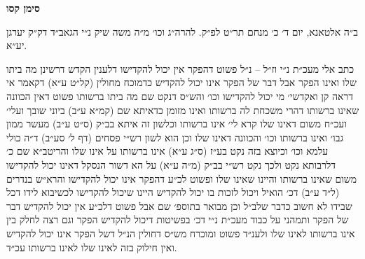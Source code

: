 \documentclass[12pt, openany]{book}
\newcommand{\chapname}{}
\newcommand{\newchap}[1]{
	\addcontentsline{toc}{chapter}{#1}
	\renewcommand{\chapname}{#1}
		\begin{center}
			\textbf{%
\fontsize{16pt}{16pt}\selectfont
				#1}
		\end{center}
}
\begin{document}
\newchap{סימן קסו}
\begin{multicols}{2}
ב״ה אלטאנא, יום ד׳ כ׳ מנחם תר״ט לפ״ק. להרה״ג וכו׳ מ״ה משה שיק נ״י הגאב״ד דק״ק יערגן יע״א.\\\vspace{0pt}

כתב אלי מעכ״ת נ״י וז״ל – נ״ל פשוט דהפקר אין יכול להקדישו דלענין הקדש דרשינן מה ביתו שלו ואינו הפקר אבל דבר של הפקר אינו יכול להקדיש כדמוכח מחולין (קל״ט ע״א) דקאמר אי דראה קן ואקדשי׳ מי יכול להקדישו וכו׳ והש״ס דנקט שם מה ביתו ברשותו פשוט דאין הכוונה שאינו ברשותו דהרי משכחת לה ברשותו ואינו מזומן כדאיתא שם (קמ״א ע״ב) ביוני שובך ועלי׳ ועכ״ח משום דאינו שלו קרא לי׳ אינו ברשותו וכלשון זה איתא בב״ק (ס״ט ע״ב) מעשר ממון גבו׳ ואינו ברשותו וכו׳ והכוונה דאינו שלו וכן הוא לשון רש״י פסחים (דף ל׳ סע״ב) ד״ה כולי עלמא וכו׳ וכיוצא בזה נקט בע״ז (ס״ג ע״א) אינו ברשותו על אינו שלו והריטב״א שם כ׳ דלרבותא נקט ולכך נקט רש״י בב״ק (מ״ה ע״א) על הא דשור הנסקל דאינו יכול להקדישו משום שאינו ברשותו והיינו שאינו שלו ופשוט לכ״ע דהפקר אינו יכול להקדישו והרא״ש בנדרים (ל״ד ע״ב) דכ׳ הואיל ויכול לזכות בו יכול להקדיש היינו שיכול להקדישו לכשיבוא לידו דכל שבידו לא חשוב כדבר שלב״ל וכן מבואר בתוספ׳ שם אבל פשוט דלכ״ע אין יכול להקדיש דבר של הפקר ותמהני על כבוד מעכ״ת נ״י דכ׳ בפשיטות דיכול להקדיש הפקר וגם רצה לחלק בין אינו ברשותו לאינו שלו ולענ״ד פשוט ומוכרח מש״ס דחולין הנ״ל דשל הפקר אינו יכול להקדיש ואין חילוק בזה לאינו שלו לאינו ברשותו עכ״ד.\\\vspace{0pt}


\end{multicols}
\end{document}
